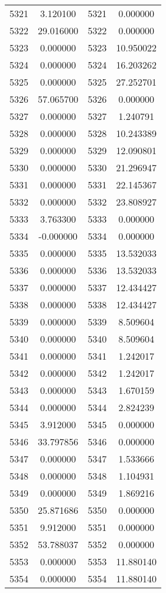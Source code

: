 \documentclass[12pt]{article}
\begin{document}
\begin{longtable}{@{}cccc@{}}
5321 & 3.120100 & 5321 & 0.000000 \\
5322 & 29.016000 & 5322 & 0.000000 \\
5323 & 0.000000 & 5323 & 10.950022 \\
5324 & 0.000000 & 5324 & 16.203262 \\
5325 & 0.000000 & 5325 & 27.252701 \\
5326 & 57.065700 & 5326 & 0.000000 \\
5327 & 0.000000 & 5327 & 1.240791 \\
5328 & 0.000000 & 5328 & 10.243389 \\
5329 & 0.000000 & 5329 & 12.090801 \\
5330 & 0.000000 & 5330 & 21.296947 \\
5331 & 0.000000 & 5331 & 22.145367 \\
5332 & 0.000000 & 5332 & 23.808927 \\
5333 & 3.763300 & 5333 & 0.000000 \\
5334 & -0.000000 & 5334 & 0.000000 \\
5335 & 0.000000 & 5335 & 13.532033 \\
5336 & 0.000000 & 5336 & 13.532033 \\
5337 & 0.000000 & 5337 & 12.434427 \\
5338 & 0.000000 & 5338 & 12.434427 \\
5339 & 0.000000 & 5339 & 8.509604 \\
5340 & 0.000000 & 5340 & 8.509604 \\
5341 & 0.000000 & 5341 & 1.242017 \\
5342 & 0.000000 & 5342 & 1.242017 \\
5343 & 0.000000 & 5343 & 1.670159 \\
5344 & 0.000000 & 5344 & 2.824239 \\
5345 & 3.912000 & 5345 & 0.000000 \\
5346 & 33.797856 & 5346 & 0.000000 \\
5347 & 0.000000 & 5347 & 1.533666 \\
5348 & 0.000000 & 5348 & 1.104931 \\
5349 & 0.000000 & 5349 & 1.869216 \\
5350 & 25.871686 & 5350 & 0.000000 \\
5351 & 9.912000 & 5351 & 0.000000 \\
5352 & 53.788037 & 5352 & 0.000000 \\
5353 & 0.000000 & 5353 & 11.880140 \\
5354 & 0.000000 & 5354 & 11.880140 \\

\end{longtable}
\end{document}
